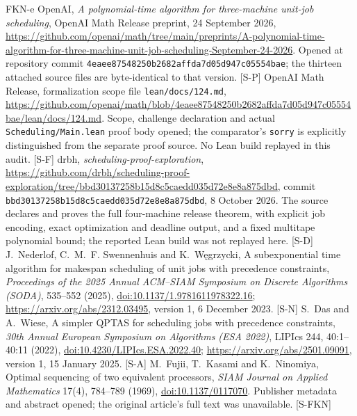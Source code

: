 \begin{thebibliography}{FKN-e}
 OpenAI, \emph{A polynomial-time algorithm for three-machine unit-job scheduling},
OpenAI Math Release preprint, 24 September 2026,
\url{https://github.com/openai/math/tree/main/preprints/A-polynomial-time-algorithm-for-three-machine-unit-job-scheduling-September-24-2026}.
Opened at repository commit \texttt{4eaee87548250b2682affda7d05d947c05554bae};
the thirteen attached source files are byte-identical to that version. [S-P]
 OpenAI Math Release, formalization scope file \texttt{lean/docs/124.md},
\url{https://github.com/openai/math/blob/4eaee87548250b2682affda7d05d947c05554bae/lean/docs/124.md}.
Scope, challenge declaration and actual \texttt{Scheduling/Main.lean} proof body opened;
the comparator's \texttt{sorry} is explicitly distinguished from the separate proof source.
No Lean build replayed in this audit. [S-F]
 drbh, \emph{scheduling-proof-exploration},
\url{https://github.com/drbh/scheduling-proof-exploration/tree/bbd30137258b15d8c5caedd035d72e8e8a875dbd},
commit \texttt{bbd30137258b15d8c5caedd035d72e8e8a875dbd}, 8 October 2026.
The source declares and proves the full four-machine release theorem, with
explicit job encoding, exact optimization and deadline output, and a fixed
multitape polynomial bound; the reported Lean build was not replayed here. [S-D]
 J.~Nederlof, C.~M.~F. Swennenhuis and K.~W\k{e}grzycki,
A subexponential time algorithm for makespan scheduling of unit jobs with precedence constraints,
\emph{Proceedings of the 2025 Annual ACM--SIAM Symposium on Discrete Algorithms (SODA)},
535--552 (2025),
\href{https://doi.org/10.1137/1.9781611978322.16}{doi:10.1137/1.9781611978322.16};
\url{https://arxiv.org/abs/2312.03495}, version 1, 6 December 2023. [S-N]
 S.~Das and A.~Wiese,
A simpler QPTAS for scheduling jobs with precedence constraints,
\emph{30th Annual European Symposium on Algorithms (ESA 2022)},
LIPIcs 244, 40:1--40:11 (2022),
\href{https://doi.org/10.4230/LIPIcs.ESA.2022.40}{doi:10.4230/LIPIcs.ESA.2022.40};
\url{https://arxiv.org/abs/2501.09091}, version 1, 15 January 2025. [S-A]
 M.~Fujii, T.~Kasami and K.~Ninomiya,
Optimal sequencing of two equivalent processors,
\emph{SIAM Journal on Applied Mathematics} 17(4), 784--789 (1969),
\href{https://doi.org/10.1137/0117070}{doi:10.1137/0117070}.
Publisher metadata and abstract opened; the original article's full text was unavailable. [S-FKN]

\end{thebibliography}
